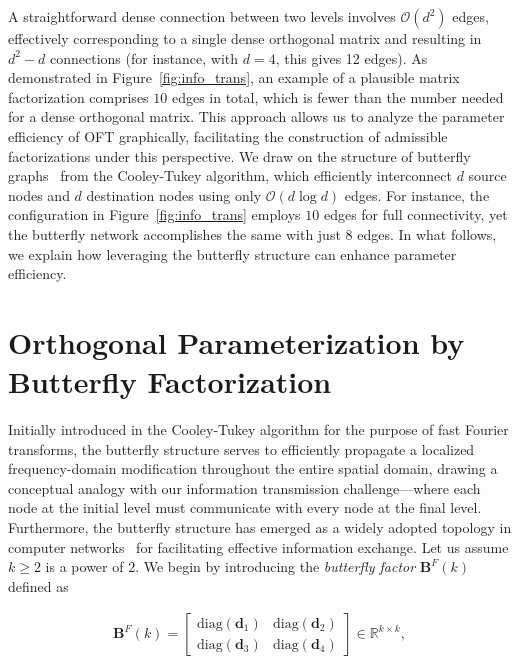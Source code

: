 A straightforward dense connection between two levels involves $\mathcal{O}(d^2)$ edges, effectively corresponding to a single dense orthogonal matrix and resulting in $d^2-d$ connections (for instance, with $d=4$, this gives 12 edges). As demonstrated in Figure~\ref{fig:info_trans}, an example of a plausible matrix factorization comprises $10$ edges in total, which is fewer than the number needed for a dense orthogonal matrix. This approach allows us to analyze the parameter efficiency of OFT graphically, facilitating the construction of admissible factorizations under this perspective. We draw on the structure of butterfly graphs~\cite{cooley1965algorithm} from the Cooley-Tukey algorithm, which efficiently interconnect $d$ source nodes and $d$ destination nodes using only $\mathcal{O}(d\log d)$ edges. For instance, the configuration in Figure~\ref{fig:info_trans} employs $10$ edges for full connectivity, yet the butterfly network accomplishes the same with just $8$ edges. In what follows, we explain how leveraging the butterfly structure can enhance parameter efficiency.

\section{Orthogonal Parameterization by Butterfly Factorization}

Initially introduced in the Cooley-Tukey algorithm for the purpose of fast Fourier transforms, the butterfly structure serves to efficiently propagate a localized frequency-domain modification throughout the entire spatial domain, drawing a conceptual analogy with our information transmission challenge—where each node at the initial level must communicate with every node at the final level. Furthermore, the butterfly structure has emerged as a widely adopted topology in computer networks~\cite{solihin2015fundamentals,li2011linear} for facilitating effective information exchange. Let us assume $k\geq 2$ is a power of $2$. We begin by introducing the \emph{butterfly factor} $\bm{B}^F(k)$ defined as

\begin{equation}\label{eq:but_factor}
\begin{aligned}
    \bm{B}^F(k)=\begin{bmatrix}
    \text{diag}(\bm{d}_1) & \text{diag}(\bm{d}_2) \\
    \text{diag}(\bm{d}_3) & \text{diag}(\bm{d}_4)
    \end{bmatrix}\in\mathbb{R}^{k\times k},
\end{aligned}
\end{equation}

